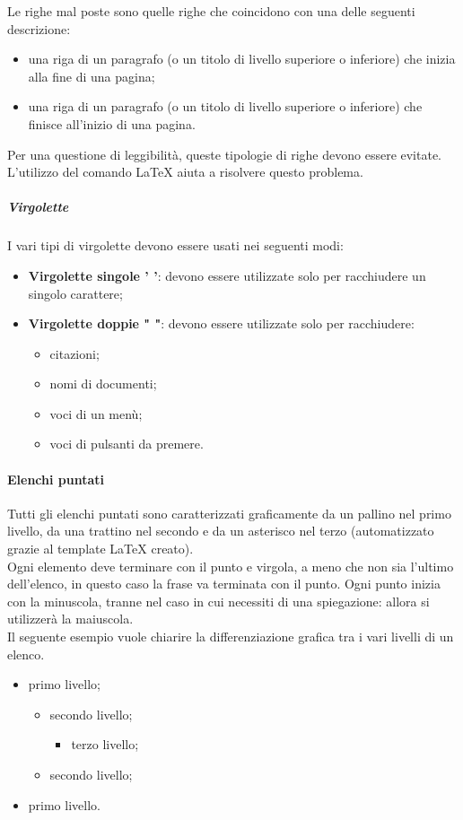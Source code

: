 Le righe mal poste sono quelle righe che coincidono con una delle seguenti descrizione:
\begin{itemize}
	\item una riga di un paragrafo (o un titolo di livello superiore o inferiore) che inizia alla fine di una pagina;
	\item una riga di un paragrafo (o un titolo di livello superiore o inferiore) che finisce all'inizio di una pagina.
\end{itemize}
Per una questione di leggibilità, queste tipologie di righe devono essere evitate.\\
 L'utilizzo del comando \LaTeX{}  aiuta a risolvere questo problema.
 \subparagraph{Virgolette}
 I vari tipi di virgolette devono essere usati nei seguenti modi:
 \begin{itemize}
 	\item \textbf{Virgolette singole ' '}: devono essere utilizzate solo per racchiudere un singolo carattere;
 	\item \textbf{Virgolette doppie " "}: devono essere utilizzate solo per racchiudere:
 	\begin{itemize}
 		\item citazioni;
 		\item nomi di documenti;
 		\item voci di un menù;
 		\item voci di pulsanti da premere.
 	\end{itemize}
 \end{itemize}
 \newpage
 \paragraph{Elenchi puntati}
Tutti gli elenchi puntati sono caratterizzati graficamente da un pallino nel primo livello, da una trattino nel secondo e da un asterisco nel terzo (automatizzato grazie al template \LaTeX{}{} creato). \\
Ogni elemento deve terminare con il punto e virgola, a meno che non sia l'ultimo dell'elenco, in questo caso la frase va terminata con il punto. Ogni punto inizia con la minuscola, tranne nel caso in cui necessiti di una spiegazione: allora
si utilizzerà la maiuscola.\\
Il seguente esempio vuole chiarire la differenziazione grafica tra i vari livelli di un elenco.
\begin{itemize}
	\item primo livello;
	\begin{itemize}
		\item secondo livello;
		\begin{itemize}
			\item terzo livello;
		\end{itemize}
		\item secondo livello;
	\end{itemize}
	\item primo livello.
\end{itemize}
